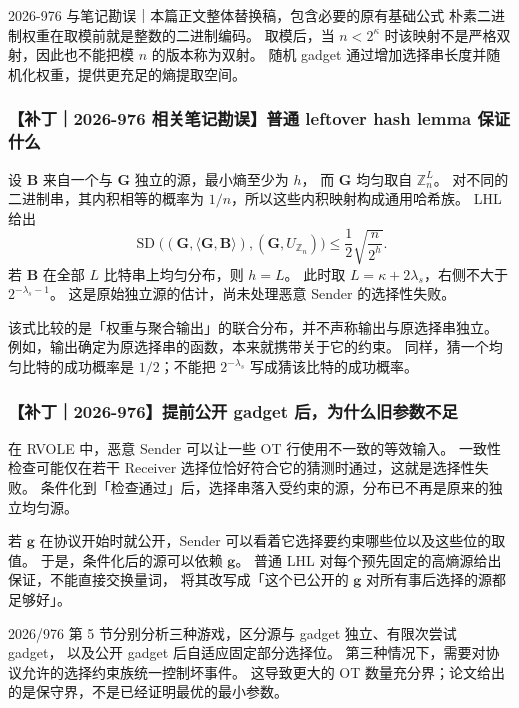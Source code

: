 \begin{patchnote}{2026-976 与笔记勘误｜本篇正文整体替换稿，包含必要的原有基础公式}
朴素二进制权重在取模前就是整数的二进制编码。
取模后，当 $n<2^\kappa$ 时该映射不是严格双射，因此也不能把模 $n$ 的版本称为双射。
随机 gadget 通过增加选择串长度并随机化权重，提供更充足的熵提取空间。

\subsubsection{【补丁｜2026-976 相关笔记勘误】普通 leftover hash lemma 保证什么}

设 $\boldsymbol B$ 来自一个与 $\boldsymbol G$ 独立的源，最小熵至少为 $h$，
而 $\boldsymbol G$ 均匀取自 $\mathbb Z_n^L$。
对不同的二进制串，其内积相等的概率为 $1/n$，所以这些内积映射构成通用哈希族。
LHL 给出
\begin{equation}\label{eq:misc-gadget:5}
\operatorname{SD}\bigl(
  (\boldsymbol G,\langle\boldsymbol G,\boldsymbol B\rangle),
  (\boldsymbol G,U_{\mathbb Z_n})\bigr)
\le \frac12\sqrt{\frac n{2^h}}.
\end{equation}
若 $\boldsymbol B$ 在全部 $L$ 比特串上均匀分布，则 $h=L$。
此时取 $L=\kappa+2\lambda_s$，右侧不大于 $2^{-\lambda_s-1}$。
这是原始独立源的估计，尚未处理恶意 Sender 的选择性失败。

该式比较的是「权重与聚合输出」的联合分布，并不声称输出与原选择串独立。
例如，输出确定为原选择串的函数，本来就携带关于它的约束。
同样，猜一个均匀比特的成功概率是 $1/2$；不能把 $2^{-\lambda_s}$ 写成猜该比特的成功概率。

\subsubsection{【补丁｜2026-976】提前公开 gadget 后，为什么旧参数不足}

在 RVOLE 中，恶意 Sender 可以让一些 OT 行使用不一致的等效输入。
一致性检查可能仅在若干 Receiver 选择位恰好符合它的猜测时通过，这就是选择性失败。
条件化到「检查通过」后，选择串落入受约束的源，分布已不再是原来的独立均匀源。

若 $\boldsymbol g$ 在协议开始时就公开，Sender 可以看着它选择要约束哪些位以及这些位的取值。
于是，条件化后的源可以依赖 $\boldsymbol g$。
普通 LHL 对每个预先固定的高熵源给出保证，不能直接交换量词，
将其改写成「这个已公开的 $\boldsymbol g$ 对所有事后选择的源都足够好」。

2026/976 第 5 节分别分析三种游戏，区分源与 gadget 独立、有限次尝试 gadget，
以及公开 gadget 后自适应固定部分选择位。
第三种情况下，需要对协议允许的选择约束族统一控制坏事件。
这导致更大的 OT 数量充分界；论文给出的是保守界，不是已经证明最优的最小参数。


\end{patchnote}
